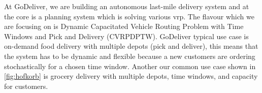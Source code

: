 At GoDeliver, we are building an autonomous last-mile delivery system and at the core is a planning system which is solving various \gls{vrp}. The flavour which we are focusing on is Dynamic Capacitated Vehicle Routing Problem with Time Windows and Pick and Delivery (CVRPDPTW). GoDeliver typical use case is on-demand food delivery with multiple depots (pick and deliver), this means that the system has to be dynamic and flexible because a new customers are ordering stochastically for a chosen time window. Another our common use case shown in \ref{fig:hofkorb} is grocery delivery with multiple depots, time windows, and capacity for customers.
